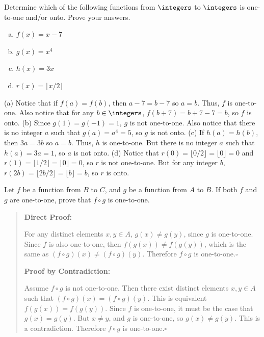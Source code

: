 \begin{exer}
Determine which of the following functions from $\integers$ to $\integers$ is one-to-one and/or onto.
Prove your answers.
\begin{enumerate}[(a)]
\item
$f(x)=x-7$

\noindent
\answerlinefour
\item
$g(x)=x^4$

\noindent
\answerlinefour
\item
$h(x)=3x$

\noindent
\answerlinefour
\item
$r(x)=\lfloor x/2\rfloor$

\noindent
\answerlinefour
\end{enumerate}
\begin{answer}
(a)
Notice that if $f(a)=f(b)$, then $a-7=b-7$ so $a=b$.  Thus, $f$ is one-to-one.
Also notice that for any $b\in\integers$, $f(b+7)=b+7-7=b$, so $f$ is onto.
(b) Since $g(1)=g(-1)=1$, $g$ is not one-to-one.  Also notice that there is no integer $a$ such that
$g(a)=a^4=5$, so $g$ is not onto.
(c) If $h(a)=h(b)$, then $3a=3b$ so $a=b$.  Thus, $h$ is one-to-one.
But there is no integer $a$ such that $h(a)=3a=1$, so $a$ is not onto.
(d) Notice that $r(0)=\lfloor 0/2\rfloor=\lfloor 0\rfloor = 0$ and 
$r(1)=\lfloor 1/2\rfloor=\lfloor 0\rfloor = 0$, so $r$ is not one-to-one.
But for any integer $b$, $r(2b)=\lfloor 2b/2\rfloor=\lfloor b\rfloor = b$, so $r$ is onto. 
\end{answer}
\end{exer}


\newpage
\begin{exa}
Let $f$ be a function from $B$ to $C$, and $g$ be a function
from $A$ to $B$.  If both $f$ and $g$ are one-to-one, prove
that $f\circ g$ is one-to-one.
\begin{quote}
\noindent 
{\bf Direct Proof:}

\noindent
For any distinct elements $x,y\in A$,
$g(x)\neq g(y)$, since $g$ is one-to-one.
Since $f$ is also one-to-one, then $f(g(x))\neq f(g(y))$, 
which is the same as $(f\circ g)(x) \neq (f\circ g)(y)$.
Therefore $f\circ g$ is one-to-one.\hfill$\square$

\bigskip
\noindent 
{\bf Proof by Contradiction:}

\noindent
Assume $f\circ g$ is not one-to-one.  Then there exist distinct elements
$x,y\in A$ such that $(f\circ g)(x)=(f\circ g)(y)$. This is equivalent
$f(g(x))=f(g(y))$.  Since $f$ is one-to-one, it must be the case that 
$g(x)=g(y)$. But $x\neq y$, and $g$ is one-to-one, so $g(x)\neq g(y)$.
This is a contradiction.  Therefore $f\circ g$ is one-to-one.\hfill$\square$
\end{quote}
\end{exa}

